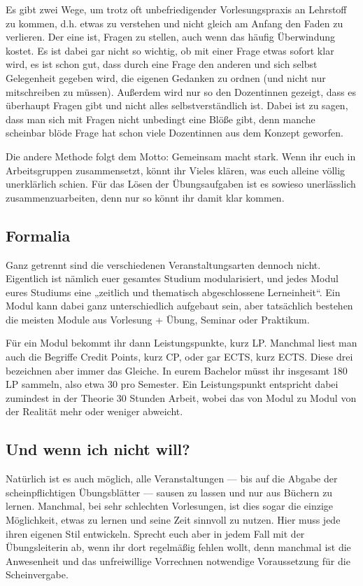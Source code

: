 Es gibt zwei Wege, um trotz oft unbefriedigender Vorlesungspraxis an Lehrstoff zu kommen, d.h. etwas zu verstehen und nicht gleich am Anfang den Faden zu verlieren. Der eine ist, Fragen zu stellen, auch wenn das häufig Überwindung kostet. Es ist dabei gar nicht so wichtig, ob mit einer Frage etwas sofort klar wird, es ist schon gut, dass durch eine Frage den anderen und sich selbst Gelegenheit gegeben wird, die eigenen Gedanken zu ordnen (und nicht nur mitschreiben zu müssen). Außerdem wird nur so den Dozentinnen gezeigt, dass es überhaupt Fragen gibt und nicht alles selbstverständlich ist. Dabei ist zu sagen, dass man sich mit Fragen nicht unbedingt eine Blöße gibt, denn manche scheinbar \glqq{}blöde\grqq{} Frage hat schon viele Dozentinnen aus dem Konzept geworfen.

Die andere Methode folgt dem Motto: \glqq{}Gemeinsam macht stark\grqq{}. Wenn ihr euch in Arbeitsgruppen zusammensetzt, könnt ihr Vieles klären, was euch alleine völlig unerklärlich schien. Für das Lösen der Übungsaufgaben ist es sowieso unerlässlich zusammenzuarbeiten, denn nur so könnt ihr damit klar kommen.
\vspace{-2mm}

\subsection{Formalia}

Ganz getrennt sind die verschiedenen Veranstaltungsarten dennoch nicht. Eigentlich ist nämlich euer gesamtes Studium modularisiert, und jedes Modul eures Studiums eine „zeitlich und thematisch abgeschlossene Lerneinheit“. Ein Modul kann dabei ganz unterschiedlich aufgebaut sein, aber tatsächlich bestehen die meisten Module aus Vorlesung + Übung, Seminar oder Praktikum.

Für ein Modul bekommt ihr dann Leistungspunkte, kurz \gls{LP}. Manchmal liest man auch die Begriffe Credit Points, kurz \gls{CP}, oder gar \gls{ECTS}, kurz ECTS. Diese drei bezeichnen aber immer das Gleiche. In eurem Bachelor müsst ihr insgesamt 180 \gls{LP} sammeln, also etwa 30 pro Semester. Ein Leistungspunkt entspricht dabei zumindest in der Theorie 30 Stunden Arbeit, wobei das von Modul zu Modul von der Realität mehr oder weniger abweicht.

\subsection{Und wenn ich nicht will?}

Natürlich ist es auch möglich, alle Veranstaltungen --- bis auf die Abgabe der scheinpflichtigen Übungsblätter --- sausen zu lassen und nur aus Büchern zu lernen. Manchmal, bei sehr schlechten Vorlesungen, ist dies sogar die einzige Möglichkeit, etwas zu lernen und seine Zeit sinnvoll zu nutzen. Hier muss jede ihren eigenen Stil entwickeln. Sprecht euch aber in jedem Fall mit der Übungsleiterin ab, wenn ihr dort regelmäßig fehlen wollt, denn manchmal ist die Anwesenheit und das unfreiwillige Vorrechnen notwendige Voraussetzung für die Scheinvergabe.
